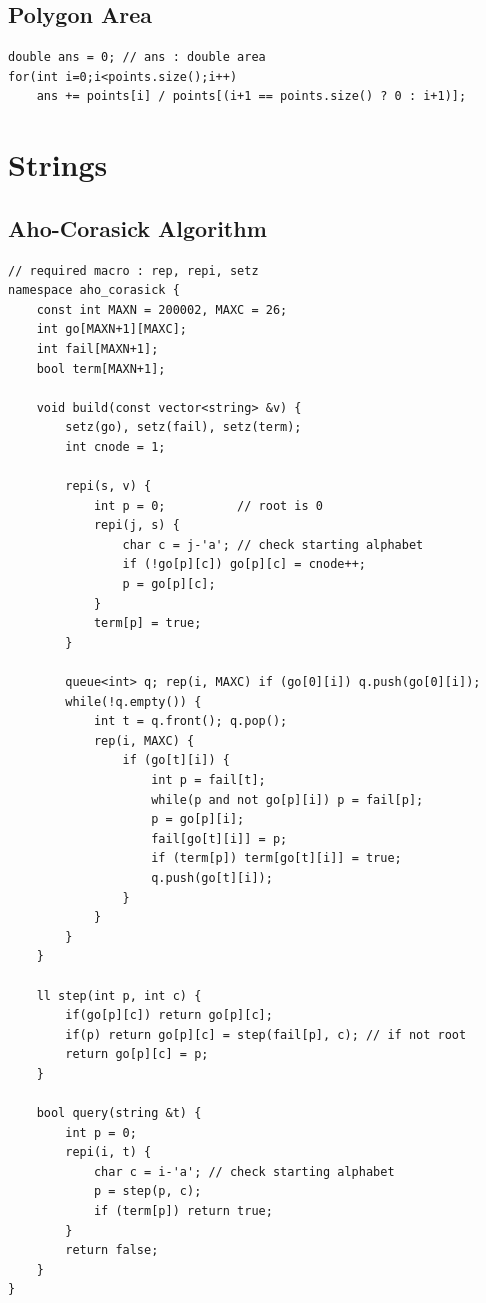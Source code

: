 \documentclass[landscape, 8pt, a4paper, oneside, twocolumn]{extarticle}
\begin{document}
\subsection{Polygon Area}
\begin{verbatim}
double ans = 0; // ans : double area
for(int i=0;i<points.size();i++)
    ans += points[i] / points[(i+1 == points.size() ? 0 : i+1)];
\end{verbatim}

\newpage
\section{Strings}

\subsection{Aho-Corasick Algorithm}
\begin{verbatim}
// required macro : rep, repi, setz
namespace aho_corasick {
    const int MAXN = 200002, MAXC = 26;
    int go[MAXN+1][MAXC];
    int fail[MAXN+1];
    bool term[MAXN+1];

    void build(const vector<string> &v) {
        setz(go), setz(fail), setz(term);
        int cnode = 1;

        repi(s, v) {
            int p = 0;          // root is 0
            repi(j, s) {
                char c = j-'a'; // check starting alphabet
                if (!go[p][c]) go[p][c] = cnode++;
                p = go[p][c];
            }
            term[p] = true;
        }

        queue<int> q; rep(i, MAXC) if (go[0][i]) q.push(go[0][i]);
        while(!q.empty()) {
            int t = q.front(); q.pop();
            rep(i, MAXC) {
                if (go[t][i]) {
                    int p = fail[t];
                    while(p and not go[p][i]) p = fail[p];
                    p = go[p][i];
                    fail[go[t][i]] = p;
                    if (term[p]) term[go[t][i]] = true;
                    q.push(go[t][i]);
                }
            }
        }
    }

    ll step(int p, int c) {
        if(go[p][c]) return go[p][c];
        if(p) return go[p][c] = step(fail[p], c); // if not root
        return go[p][c] = p;
    }

    bool query(string &t) {
        int p = 0;
        repi(i, t) {
            char c = i-'a'; // check starting alphabet
            p = step(p, c);
            if (term[p]) return true;
        }
        return false;
    }
}
\end{verbatim}
\end{document}
